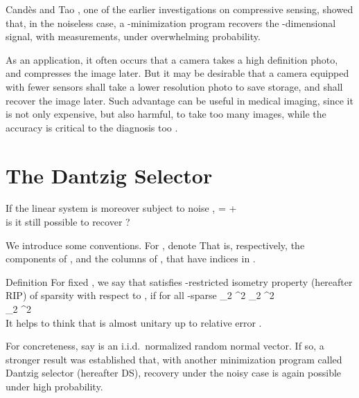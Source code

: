 Candès and Tao \cite {Can05}, one of the earlier investigations on compressive sensing, showed that, in the noiseless case, a -minimization program recovers the -dimensional signal, with  measurements, under overwhelming probability.

As an application, it often occurs that a camera takes a high definition photo, and compresses the image later.
But it may be desirable that a camera equipped with fewer sensors shall take a lower resolution photo to save storage, and shall recover the image later.
Such advantage can be useful in medical imaging, since it is not only expensive, but also harmful, to take too many images, while the accuracy is critical to the diagnosis too \cite {CaT07}.



\section {The Dantzig Selector}

If the linear system is moreover subject to noise ,
%
 {
=  +  \\
}
is it still possible to recover ?

We introduce some conventions.
For , denote
%
%
That is, respectively, the components of , and the columns of , that have indices in .


\Result
{Definition}
{
For fixed , we say that  satisfies -restricted isometry property (hereafter  RIP) of sparsity  with respect to , if for all -sparse 
%
 {
  _2 ^2
\leq {} _2 ^2 \\
%
\leq {}  _2 ^2 \\
}
}
%
It helps to think that  is almost unitary up to relative error .

For concreteness, say  is an i.i.d.\ normalized random normal vector.
If so, a stronger result was established \cite {CaT07} that, with another  minimization program called Dantzig selector (hereafter DS), recovery under the noisy case is again possible under high probability.

